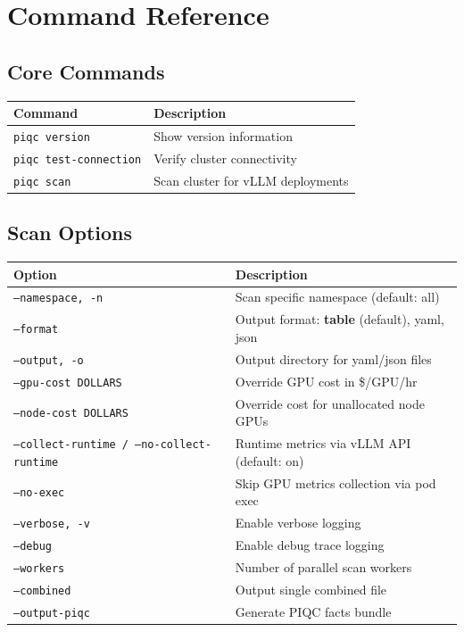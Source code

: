 \documentclass[11pt,a4paper]{article}
\begin{document}
\section{Command Reference}

\subsection{Core Commands}

\begin{table}[h]
\small
\begin{tabular}{@{}p{4cm}p{9cm}@{}}
\toprule
\textbf{Command} & \textbf{Description} \\
\midrule
\texttt{piqc version} & Show version information \\
\texttt{piqc test-connection} & Verify cluster connectivity \\
\texttt{piqc scan} & Scan cluster for vLLM deployments \\
\bottomrule
\end{tabular}
\end{table}

\subsection{Scan Options}

\begin{table}[h]
\small
\begin{tabular}{@{}p{5.5cm}p{7.5cm}@{}}
\toprule
\textbf{Option} & \textbf{Description} \\
\midrule
\texttt{--namespace, -n} & Scan specific namespace (default: all) \\
\texttt{--format} & Output format: \textbf{table} (default), yaml, json \\
\texttt{--output, -o} & Output directory for yaml/json files \\
\texttt{--gpu-cost DOLLARS} & Override GPU cost in \$/GPU/hr \\
\texttt{--node-cost DOLLARS} & Override cost for unallocated node GPUs \\
\texttt{--collect-runtime / --no-collect-runtime} & Runtime metrics via vLLM API (default: on) \\
\texttt{--no-exec} & Skip GPU metrics collection via pod exec \\
\texttt{--verbose, -v} & Enable verbose logging \\
\texttt{--debug} & Enable debug trace logging \\
\texttt{--workers} & Number of parallel scan workers \\
\texttt{--combined} & Output single combined file \\
\texttt{--output-piqc} & Generate PIQC facts bundle \\
\bottomrule
\end{tabular}
\end{table}
\end{document}
